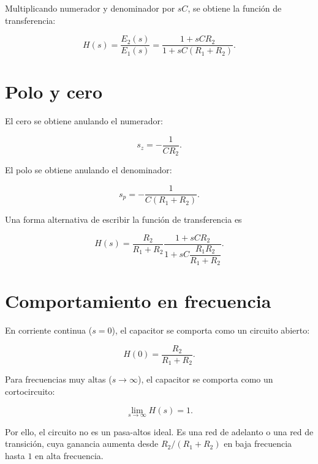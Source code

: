 \documentclass[12pt,a4paper]{article}
\begin{document}
Multiplicando numerador y denominador por $sC$, se obtiene la función de transferencia:

\begin{equation}
    \boxed{
    H(s)=\frac{E_2(s)}{E_1(s)}
    =\frac{1+sCR_2}{1+sC(R_1+R_2)}
    }.
\end{equation}

\section*{Polo y cero}

El cero se obtiene anulando el numerador:

\begin{equation}
    s_z=-\frac{1}{CR_2}.
\end{equation}

El polo se obtiene anulando el denominador:

\begin{equation}
    s_p=-\frac{1}{C(R_1+R_2)}.
\end{equation}

Una forma alternativa de escribir la función de transferencia es

\begin{equation}
    H(s)=
    \frac{R_2}{R_1+R_2}
    \frac{1+sCR_2}
         {1+sC\dfrac{R_1R_2}{R_1+R_2}}.
\end{equation}

\section*{Comportamiento en frecuencia}

En corriente continua ($s=0$), el capacitor se comporta como un circuito abierto:

\begin{equation}
    H(0)=\frac{R_2}{R_1+R_2}.
\end{equation}

Para frecuencias muy altas ($s\rightarrow\infty$), el capacitor se comporta como un
cortocircuito:

\begin{equation}
    \lim_{s\rightarrow\infty}H(s)=1.
\end{equation}

Por ello, el circuito no es un pasa-altos ideal. Es una red de adelanto o una red de
transici\'on, cuya ganancia aumenta desde $R_2/(R_1+R_2)$ en baja frecuencia hasta $1$
en alta frecuencia.
\end{document}

